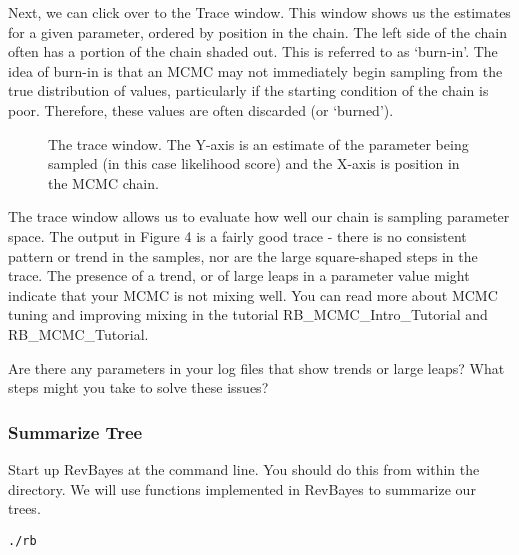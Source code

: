 Next, we can click over to the Trace window. This window shows us the estimates for a given parameter, ordered by position in the chain. The left side of the chain often has a portion of the chain shaded out. This is referred to as `burn-in'. The idea of burn-in is that an MCMC may not immediately begin sampling from the true distribution of values, particularly if the starting condition of the chain is poor. Therefore, these values are often discarded (or `burned'). \par
\begin{figure}[h!]
\centering
{}
\caption{\small The trace window. The Y-axis is an estimate of the parameter being sampled (in this case likelihood score) and the X-axis is position in the MCMC chain.}
\label{fig:tracer}
\end{figure}
The trace window allows us to evaluate how well our chain is sampling parameter space. The output in Figure 4 is a fairly good trace - there is no consistent pattern or trend in the samples, nor are the large square-shaped steps in the trace. The presence of a trend, or of large leaps in a parameter value might indicate that your MCMC is not mixing well. You can read more about MCMC tuning and improving mixing in the tutorial RB\_MCMC\_Intro\_Tutorial and RB\_MCMC\_Tutorial. \par

Are there any parameters in your log files that show trends or large leaps? What steps might you take to solve these issues? \par



\medskip
\subsubsection{Summarize Tree}\label{subsub:RB-SummarizeTree}


Start up RevBayes at the command line. You should do this from within the \\ directory. We will use functions implemented in RevBayes to summarize our trees.
{\tt \begin{snugshade*}
\begin{lstlisting}
./rb
\end{lstlisting}
\end{snugshade*}}

